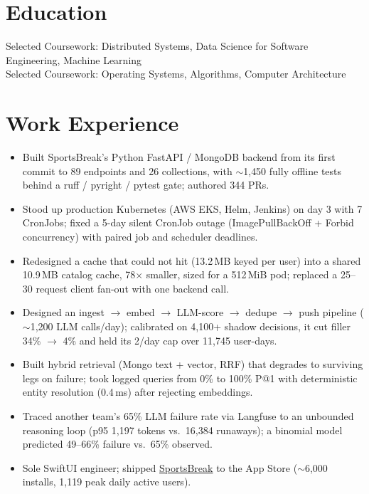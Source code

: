 \documentclass[11pt, letterpaper]{article}
\begin{document}

\section{Education}
Selected Coursework: Distributed Systems, Data Science for Software Engineering, Machine Learning\\[1pt]
Selected Coursework: Operating Systems, Algorithms, Computer Architecture

\section{Work Experience}
\begin{itemize}
  \item Built SportsBreak's Python FastAPI / MongoDB backend from its first commit to 89 endpoints and 26 collections, with $\sim$1{,}450 fully offline tests behind a ruff / pyright / pytest gate; authored 344 PRs.
  \item Stood up production Kubernetes (AWS EKS, Helm, Jenkins) on day 3 with 7 CronJobs; fixed a 5-day silent CronJob outage (ImagePullBackOff + Forbid concurrency) with paired job and scheduler deadlines.
  \item Redesigned a cache that could not hit (13.2\,MB keyed per user) into a shared 10.9\,MB catalog cache, 78$\times$ smaller, sized for a 512\,MiB pod; replaced a 25--30 request client fan-out with one backend call.
  \item Designed an ingest $\to$ embed $\to$ LLM-score $\to$ dedupe $\to$ push pipeline ($\sim$1{,}200 LLM calls/day); calibrated on 4{,}100+ shadow decisions, it cut filler 34\% $\to$ 4\% and held its 2/day cap over 11{,}745 user-days.
  \item Built hybrid retrieval (Mongo text + vector, RRF) that degrades to surviving legs on failure; took logged queries from 0\% to 100\% P@1 with deterministic entity resolution (0.4\,ms) after rejecting embeddings.
  \item Traced another team's 65\% LLM failure rate via Langfuse to an unbounded reasoning loop (p95 1{,}197 tokens vs.\ 16{,}384 runaways); a binomial model predicted 49--66\% failure vs.\ 65\% observed.
  \item Sole SwiftUI engineer; shipped \href{https://apps.apple.com/app/id6762649287}{SportsBreak} to the App Store ($\sim$6{,}000 installs, 1{,}119 peak daily active users).
\end{itemize}
\end{document}
